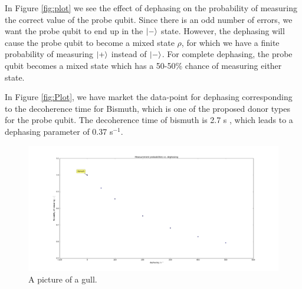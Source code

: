 In Figure \ref{fig:plot} we see the effect of dephasing on the probability of measuring the correct value of the probe qubit. Since there is an odd number of errors, we want the probe qubit to end up in the $\ket{-}$ state. However, the dephasing will cause the probe qubit to become a mixed state $\rho$, for which we have a finite probability of measuring $\ket{+} $ instead of $\ket{-}$. For complete dephasing, the probe qubit becomes a mixed state which has a 50-50\% chance of measuring either state. 

In Figure \ref{fig:Plot}, we have market the data-point for dephasing corresponding to the decoherence time for Bismuth, which is one of the proposed donor types for the probe qubit. The decoherence time of bismuth is 2.7 s \cite{something}, which leads to a dephasing parameter of 0.37 s$^{-1}$. 

\begin{figure}[!ht]
  \caption{A picture of a gull.}
  \centering
    \includegraphics[width=\textwidth]{Figures/measurement_dephasing_graph.png}
\end{figure}

